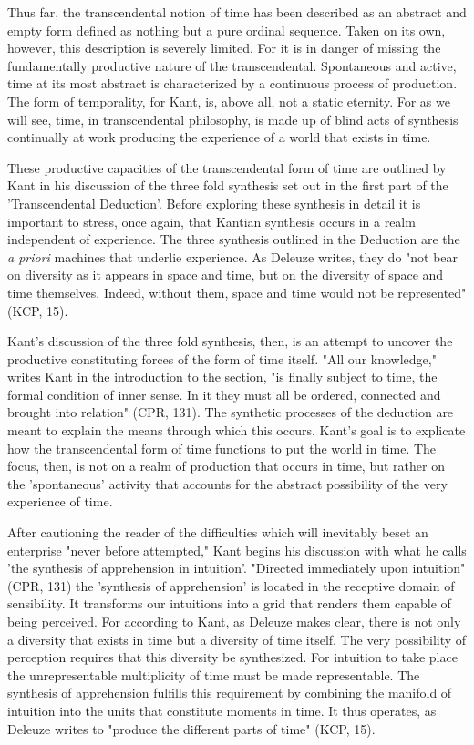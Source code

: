 Thus far, the transcendental notion of time has been described as an abstract and empty form defined as nothing but a pure ordinal sequence. Taken on its own, however, this description is severely limited. For it is in danger of missing the fundamentally productive nature of the transcendental. Spontaneous and active, time at its most abstract is characterized by a continuous process of production. The form of temporality, for Kant, is, above all, not a static eternity. For as we will see, time, in transcendental philosophy, is made up of blind acts of synthesis continually at work producing the experience of a world that exists in time.

These productive capacities of the transcendental form of time are outlined by Kant in his discussion of the three fold synthesis set out in the first part of the 'Transcendental Deduction'. Before exploring these synthesis in detail it is important to stress, once again, that Kantian synthesis occurs in a realm independent of experience. The three synthesis outlined in the Deduction are the \textit{a priori} machines that underlie experience. As Deleuze writes, they do "not bear on diversity as it appears in space and time, but on the diversity of space and time themselves. Indeed, without them, space and time would not be represented"(KCP, 15).

Kant's discussion of the three fold synthesis, then, is an attempt to uncover the productive constituting forces of the form of time itself. "All our knowledge," writes Kant in the introduction to the section, "is finally subject to time, the formal condition of inner sense. In it they must all be ordered, connected and brought into relation" (CPR, 131). The synthetic processes of the deduction are meant to explain the means through which this occurs. Kant's goal is to explicate how the transcendental form of time functions to put the world in time. The focus, then, is not on a realm of production that occurs in time, but rather on the 'spontaneous' activity that accounts for the abstract possibility of the very experience of time.

After cautioning the reader of the difficulties which will inevitably beset an enterprise "never before attempted," Kant begins his discussion with what he calls 'the synthesis of apprehension in intuition'. "Directed immediately upon intuition" (CPR, 131) the 'synthesis of apprehension' is located in the receptive domain of sensibility. It transforms our intuitions into a grid that renders them capable of being perceived. For according to Kant, as Deleuze makes clear, there is not only a diversity that exists in time but a diversity of time itself. The very possibility of perception requires that this diversity be synthesized. For intuition to take place the unrepresentable multiplicity of time must be made representable. The synthesis of apprehension fulfills this requirement by combining the manifold of intuition into the units that constitute moments in time. It thus operates, as Deleuze writes to "produce the different parts of time" (KCP, 15).


